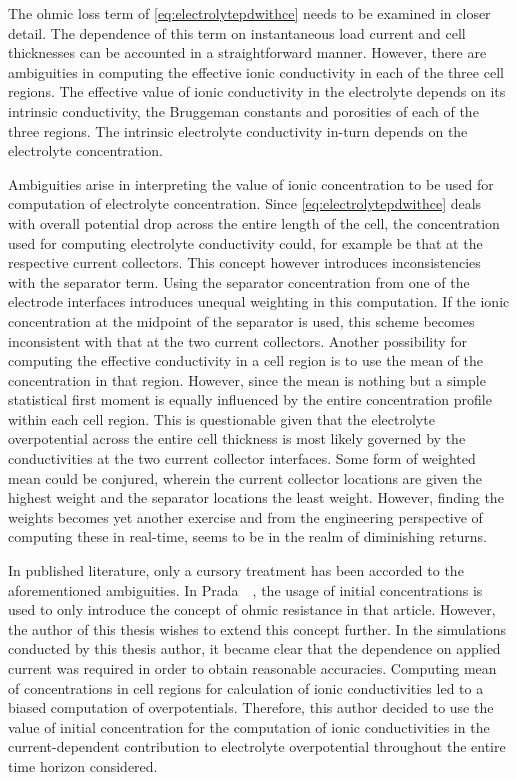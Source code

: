 The ohmic  loss term  of \cref{eq:electrolytepdwithce} needs  to be  examined in
closer detail.  The dependence of  this term  on instantaneous load  current and
cell thicknesses  can be accounted  in a straightforward manner.  However, there
are ambiguities  in computing the  effective ionic  conductivity in each  of the
three cell regions. The effective value of ionic conductivity in the electrolyte
depends on its intrinsic conductivity, the Bruggeman constants and porosities of
each  of  the three  regions.  The  intrinsic electrolyte  conductivity  in-turn
depends on the electrolyte concentration.

Ambiguities   arise   in  interpreting   the   value   of  ionic   concentration
to   be    used   for   computation   of    electrolyte   concentration.   Since
\cref{eq:electrolytepdwithce}  deals  with  overall potential  drop  across  the
entire  length of  the cell,  the concentration  used for  computing electrolyte
conductivity could,  for example be  that at the respective  current collectors.
This concept however  introduces inconsistencies with the  separator term. Using
the  separator concentration  from one  of the  electrode interfaces  introduces
unequal  weighting  in this  computation.  If  the  ionic concentration  at  the
midpoint of the separator is used, this scheme becomes inconsistent with that at
the  two current  collectors. Another  possibility for  computing the  effective
conductivity in a  cell region is to  use the mean of the  concentration in that
region. However, since the mean is nothing but a simple statistical first moment
is  equally influenced  by the  entire  concentration profile  within each  cell
region. This is questionable given that the electrolyte overpotential across the
entire cell thickness  is most likely governed by the  conductivities at the two
current  collector interfaces.  Some form  of weighted  mean could  be conjured,
wherein the  current collector locations  are given  the highest weight  and the
separator locations the  least weight. However, finding the  weights becomes yet
another  exercise and  from the  engineering perspective  of computing  these in
real-time, seems to be in the realm of diminishing returns.

In  published  literature,  only  a  cursory  treatment  has  been  accorded  to
the  aforementioned  ambiguities.  In  Prada~\etal~\cite{Prada2012},  the  usage
of  initial concentrations  is  used  to only  introduce  the  concept of  ohmic
resistance  in that  article.  However,  the author  of  this  thesis wishes  to
extend  this  concept further.  In  the  simulations  conducted by  this  thesis
author, it  became clear  that the  dependence on  applied current  was required
in  order to  obtain  reasonable accuracies.  Computing  mean of  concentrations
in  cell  regions for  calculation  of  ionic  conductivities  led to  a  biased
computation of overpotentials.  Therefore, this author decided to  use the value
of  initial concentration  for the  computation of  ionic conductivities  in the
current-dependent  contribution  to  electrolyte  overpotential  throughout  the
entire time horizon considered.

